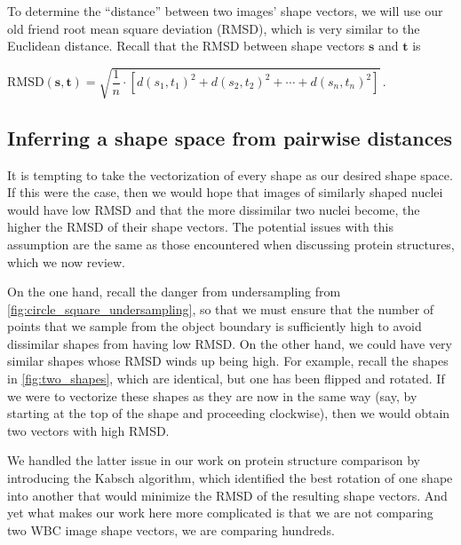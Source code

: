\begin{note}\end{note}

To determine the ``distance'' between two images' shape vectors, we will use our old friend root mean square deviation (RMSD), which is very similar to the Euclidean distance. Recall that the RMSD between shape vectors $\mathbf{s}$ and $\mathbf{t}$ is

\begin{center}
$\text{RMSD}(\mathbf{s}, \mathbf{t}) = \sqrt{\dfrac{1}{n} \cdot \left[d(s_1, t_1)^2 + d(s_2, t_2)^2 + \cdots + d(s_n, t_n)^2\right]}\,.$
\end{center}

\FloatBarrier
{}
\subsection{Inferring a shape space from pairwise distances}

It is tempting to take the vectorization of every shape as our desired shape space. If this were the case, then we would hope that images of similarly shaped nuclei would have low RMSD and that the more dissimilar two nuclei become, the higher the RMSD of their shape vectors. The potential issues with this assumption are the same as those encountered when discussing protein structures, which we now review.

On the one hand, recall the danger from undersampling from \autoref{fig:circle_square_undersampling}, so that we must ensure that the number of points that we sample from the object boundary is sufficiently high to avoid dissimilar shapes from having low RMSD. On the other hand, we could have very similar shapes whose RMSD winds up being high. For example, recall the shapes in \autoref{fig:two_shapes}, which are identical, but one has been flipped and rotated. If we were to vectorize these shapes as they are now in the same way (say, by starting at the top of the shape and proceeding clockwise), then we would obtain two vectors with high RMSD.

We handled the latter issue in our work on protein structure comparison by introducing the Kabsch algorithm, which identified the best rotation of one shape into another that would minimize the RMSD of the resulting shape vectors. And yet what makes our work here more complicated is that we are not comparing  two WBC image shape vectors, we are comparing hundreds.

